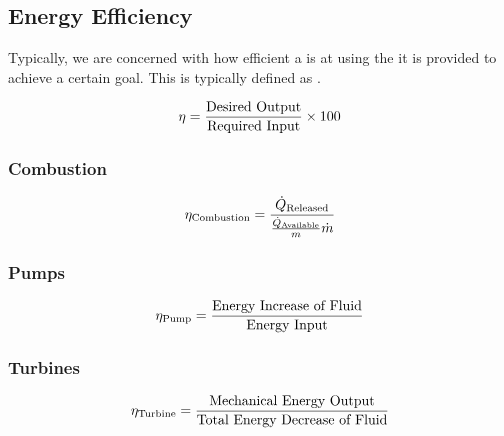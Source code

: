 \subsection{Energy Efficiency}\label{subsec:Energy_Efficiency}
Typically, we are concerned with how efficient a  is at using the  it is provided to achieve a certain goal.
This is typically defined as .

\begin{equation}\label{eq:Energy_Efficiency}
  \eta = \frac{\text{Desired Output}}{\text{Required Input}} \times 100
\end{equation}

\subsubsection{Combustion}\label{subsubsec:Energy_Efficiency-Combustion}
\begin{equation}\label{eq:Energy_Efficiency-Combustion}
  \eta_{\mathrm{Combustion}} = \frac{\dot{Q}_{\mathrm{Released}}}{\frac{\dot{Q}_{\mathrm{Available}}}{m} \dot{m}}
\end{equation}

\subsubsection{Pumps}\label{subsubsec:Energy_Efficiency-Pumps}
\begin{equation}\label{eq:Energy_Efficiency-Pumps}
  \eta_{\mathrm{Pump}} = \frac{\text{Energy Increase of Fluid}}{\text{Energy Input}}
\end{equation}

\subsubsection{Turbines}\label{subsubsec:Energy_Efficiency-Turbines}
\begin{equation}\label{eq:Energy_Efficiency-Turbines}
  \eta_{\mathrm{Turbine}} = \frac{\text{Mechanical Energy Output}}{\text{Total Energy Decrease of Fluid}}
\end{equation}

